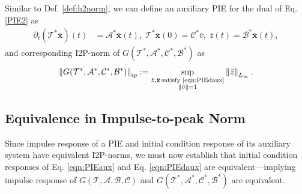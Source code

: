 \documentclass[letterpaper, 10 pt, conference]{ieeeconf}
\newcommand{\mcl}[1]{\mathcal{#1}}
\newcommand{\mbf}[1]{\mathbf{#1}}
\newcommand{\norm}[1]{\left\lVert #1 \right\rVert}
\theoremstyle{definition}
\begin{document}
Similar to Def. \ref{def:h2norm}, we can define an auxiliary PIE for the dual of Eq. \eqref{PIE2} as 
\begin{align}\label{eqn:PIEdaux}
\partial_t(\mcl T^* \bar{\mbf x})(t)&= \mcl A^* \bar{\mbf x}(t),\; \mcl T^* \bar{\mbf x}(0) =\mcl{C}^* \bar v,\;\bar z(t)=\mcl B^* \bar{\mbf x}(t),
\end{align}
 and corresponding I2P-norm of $G(\mcl T^*,\mcl A^*,\mcl C^*,\mcl B^*)$ as
\[
 \norm{G(\mcl T^*, \mcl A^*,\mcl C^*,\mcl B^*)}_{ip}:=\sup_{\substack{\bar{z},\bar{\mbf x}\, \text{satisfy~\eqref{eqn:PIEdaux}}\\ \norm{\bar v}=1}} \norm{\bar z}_{L_\infty}.
\]

\subsection{Equivalence in Impulse-to-peak Norm}
Since impulse response of a PIE and initial condition response of its auxiliary system have equivalent I2P-norms, we must now establish that initial condition responses of Eq. \eqref{eqn:PIEaux} and Eq. \eqref{eqn:PIEdaux} are equivalent---implying impulse response of $G(\mcl T,\mcl A,\mcl B,\mcl C)$ and $G(\mcl T^*,\mcl A^*,\mcl C^*,\mcl B^*)$ are equivalent.
\end{document}
